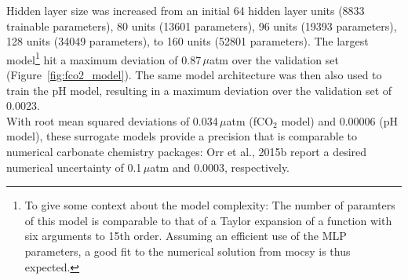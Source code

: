 \documentclass{article}
\begin{document}
	Hidden layer size was increased from an initial 64 hidden layer units (8833 trainable parameters), 80 units (13601 parameters), 96 units (19393 parameters), 128 units (34049 parameters), to 160 units (52801 parameters). The largest model\footnote{To give some context about the model complexity: The number of paramters of this model is comparable to that of a Taylor expansion of a function with six arguments to 15th order. Assuming an efficient use of the MLP parameters, a good fit to the numerical solution from mocsy is thus expected.} hit a maximum deviation of 0.87\,$\mu$atm over the validation set (Figure~\ref{fig:fco2_model}).
	The same model architecture was then also used to train the pH model, %
	resulting in a maximum deviation over the validation set of 0.0023. \\
	With root mean squared deviations of 0.034\,$\mu$atm (fCO$_2$ model) and 0.00006 (pH model), these surrogate models provide a precision that is comparable to numerical carbonate chemistry packages: Orr et al., 2015b report a desired numerical uncertainty of 0.1\,$\mu$atm and 0.0003, respectively.
	
\end{document}
